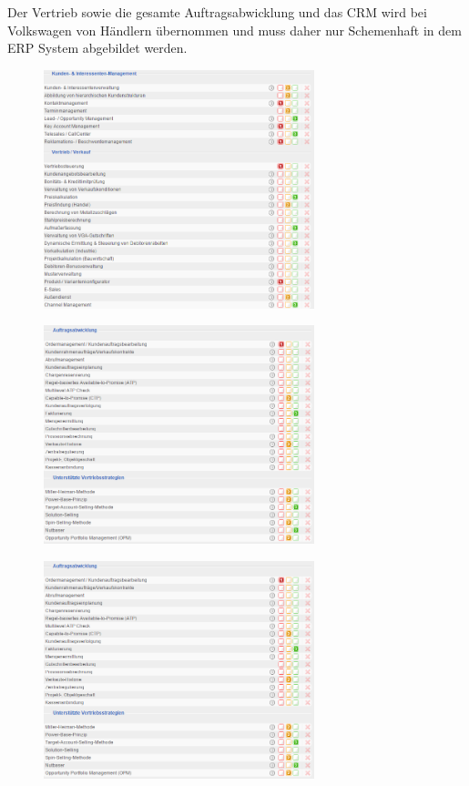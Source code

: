 \documentclass[12pt]{article}
\begin{document}
\noindent
Der Vertrieb sowie die gesamte Auftragsabwicklung und das CRM wird bei Volkswagen von Händlern übernommen und muss daher nur Schemenhaft in dem ERP System abgebildet werden.
\begin{figure}[here!]
\centering
\includegraphics[width=0.7\textwidth]{images/tr11}
\end{figure}\FloatBarrier
\noindent
\begin{figure}[here!]
\centering
\includegraphics[width=0.7\textwidth]{images/tr12}
\end{figure}\FloatBarrier
\noindent
\begin{figure}[here!]
\centering
\includegraphics[width=0.7\textwidth]{images/tr13}
\end{figure}\FloatBarrier
\end{document}
